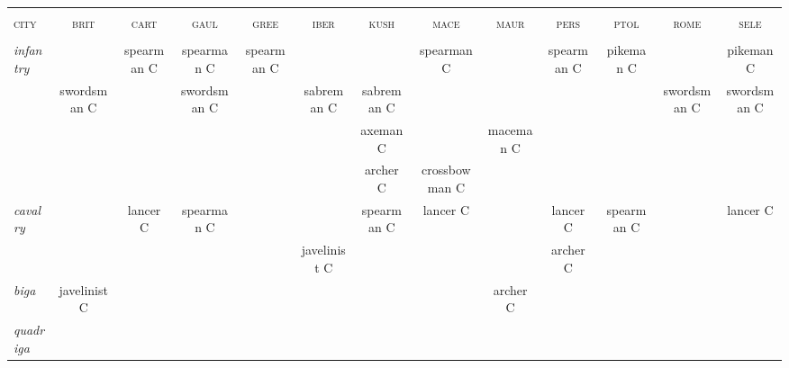 \documentclass{article}
\newcommand{\brit}{\textsc{\color{blue} brit}}
\newcommand{\cart}{\textsc{\color{blue} cart}}
\newcommand{\gaul}{\textsc{\color{blue} gaul}}
\newcommand{\gree}{\textsc{\color{blue} gree}}
\newcommand{\iber}{\textsc{\color{blue} iber}}
\newcommand{\kush}{\textsc{\color{blue} kush}}
\newcommand{\mace}{\textsc{\color{blue} mace}}
\newcommand{\maur}{\textsc{\color{blue} maur}}
\newcommand{\pers}{\textsc{\color{blue} pers}}
\newcommand{\ptol}{\textsc{\color{blue} ptol}}
\newcommand{\rome}{\textsc{\color{blue} rome}}
\newcommand{\sele}{\textsc{\color{blue} sele}}
\newcommand{\city}{\textsc{\color{blue} city}}
\begin{document}
\begin{landscape}
\begin{tabular}{l||c|c|c|c||c|c|c|c||c|c|c|c}
\hline
\hline
 &                &                &                &                &                &                &                &                &                &                &                &                \\
\city %
 & \brit          & \cart          & \gaul          & \gree          & \iber          & \kush          & \mace          & \maur          & \pers          & \ptol          & \rome          & \sele          \\
 &                &                &                &                &                &                &                &                &                &                &                &                \\
\hline
\hline\textit{infantry}
 &                & spearman C     & spearman C     & spearman C     &                &                & spearman C     &                & spearman C     & pikeman C      &                & pikeman C      \\
 & swordsman C    &                & swordsman C    &                & sabreman C     & sabreman C     &                &                &                &                & swordsman C    & swordsman C    \\
 &                &                &                &                &                & axeman C       &                & maceman C      &                &                &                &                \\
 &                &                &                &                &                & archer C       & crossbowman C  &                &                &                &                &                \\
\hline\textit{cavalry}
 &                & lancer C       & spearman C     &                &                & spearman C     & lancer C       &                & lancer C       & spearman C     &                & lancer C       \\
 &                &                &                &                & javelinist C   &                &                &                & archer C       &                &                &                \\
\hline\textit{biga}
 & javelinist C   &                &                &                &                &                &                & archer C       &                &                &                &                \\
\hline\textit{quadriga}

\end{tabular}
\end{landscape}
\end{document}
